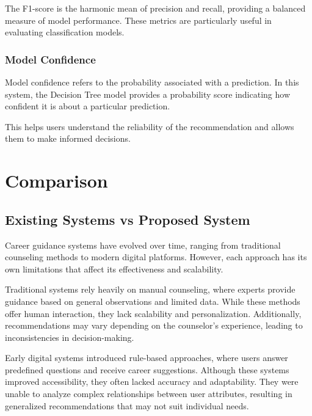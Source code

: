 \documentclass[12pt,a4paper]{report}
\begin{document}
{The F1-score is the harmonic mean of precision and recall, providing a balanced measure of model performance. These metrics are particularly useful in evaluating classification models.

\subsection{Model Confidence}

Model confidence refers to the probability associated with a prediction. In this system, the Decision Tree model provides a probability score indicating how confident it is about a particular prediction.

This helps users understand the reliability of the recommendation and allows them to make informed decisions.

\clearpage
\setcounter{page}{31}

\chapter{Comparison}
\setlength{\parindent}{0pt}
\setlength{\parskip}{0.6em}
\justifying

\section{Existing Systems vs Proposed System}

Career guidance systems have evolved over time, ranging from traditional counseling methods to modern digital platforms. However, each approach has its own limitations that affect its effectiveness and scalability.

Traditional systems rely heavily on manual counseling, where experts provide guidance based on general observations and limited data. While these methods offer human interaction, they lack scalability and personalization. Additionally, recommendations may vary depending on the counselor’s experience, leading to inconsistencies in decision-making.

Early digital systems introduced rule-based approaches, where users answer predefined questions and receive career suggestions. Although these systems improved accessibility, they often lacked accuracy and adaptability. They were unable to analyze complex relationships between user attributes, resulting in generalized recommendations that may not suit individual needs.

}
\end{document}
